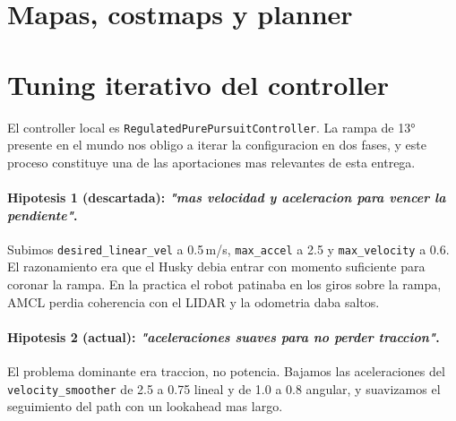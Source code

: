 \documentclass[11pt,a4paper]{article}
\begin{document}
\section{Mapas, costmaps y planner}
\label{sec:costmaps}



\section{Tuning iterativo del controller}
\label{sec:tuning}

El controller local es \texttt{RegulatedPurePursuitController}. La rampa de 13°
presente en el mundo nos obligo a iterar la configuracion en dos fases, y este
proceso constituye una de las aportaciones mas relevantes de esta entrega.

\paragraph{Hipotesis 1 (descartada): \emph{"mas velocidad y aceleracion para vencer la pendiente"}.}
Subimos \texttt{desired\_linear\_vel} a 0.5\,m/s, \texttt{max\_accel} a 2.5 y
\texttt{max\_velocity} a 0.6. El razonamiento era que el Husky debia entrar con
momento suficiente para coronar la rampa. En la practica el robot patinaba en
los giros sobre la rampa, AMCL perdia coherencia con el LIDAR y la odometria
daba saltos.

\paragraph{Hipotesis 2 (actual): \emph{"aceleraciones suaves para no perder traccion"}.}
El problema dominante era traccion, no potencia. Bajamos las aceleraciones del
\texttt{velocity\_smoother} de 2.5 a 0.75 lineal y de 1.0 a 0.8 angular, y
suavizamos el seguimiento del path con un lookahead mas largo.
\end{document}
